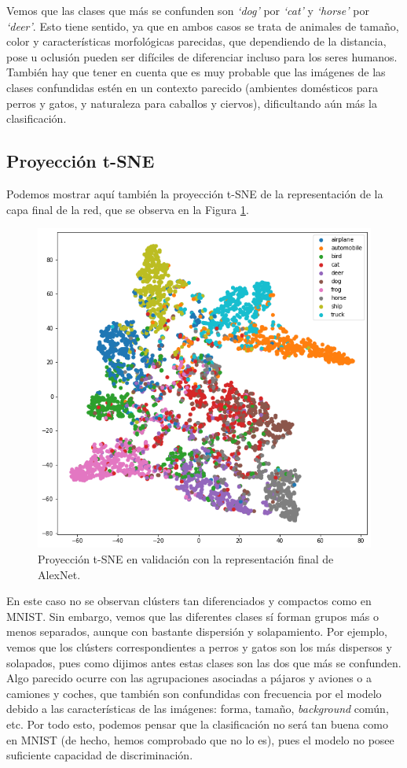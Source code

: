\documentclass[11pt]{article}
\begin{document}
Vemos que las clases que más se confunden son \textit{`dog'} por \textit{`cat'} y \textit{`horse'} por \textit{`deer'}. Esto tiene sentido, ya que en ambos casos se trata de animales de tamaño, color y características morfológicas parecidas, que dependiendo de la distancia, pose u oclusión pueden ser difíciles de diferenciar incluso para los seres humanos. También hay que tener en cuenta que es muy probable que las imágenes de las clases confundidas estén en un contexto parecido (ambientes domésticos para perros y gatos, y naturaleza para caballos y ciervos), dificultando aún más la clasificación.

\subsection*{Proyección t-SNE}

Podemos mostrar aquí también la proyección t-SNE de la representación de la capa final de la red, que se observa en la Figura \ref{fig:2_tsne}.

\begin{figure}[h!]
  \centering
  \includegraphics[width=.6\textwidth]{img/2_tsne_final}
  \caption{Proyección t-SNE en validación con la representación final de AlexNet.}
  \label{fig:2_tsne}
\end{figure}

En este caso no se observan clústers tan diferenciados y compactos como en MNIST. Sin embargo, vemos que las diferentes clases sí forman grupos más o menos separados, aunque con bastante dispersión y solapamiento. Por ejemplo, vemos que los clústers correspondientes a perros y gatos son los más dispersos y solapados, pues como dijimos antes estas clases son las dos que más se confunden. Algo parecido ocurre con las agrupaciones asociadas a pájaros y aviones o a camiones y coches, que también son confundidas con frecuencia por el modelo debido a las características de las imágenes: forma, tamaño, \textit{background} común, etc. Por todo esto, podemos pensar que la clasificación no será tan buena como en MNIST (de hecho, hemos comprobado que no lo es), pues el modelo no posee suficiente capacidad de discriminación.
\end{document}
